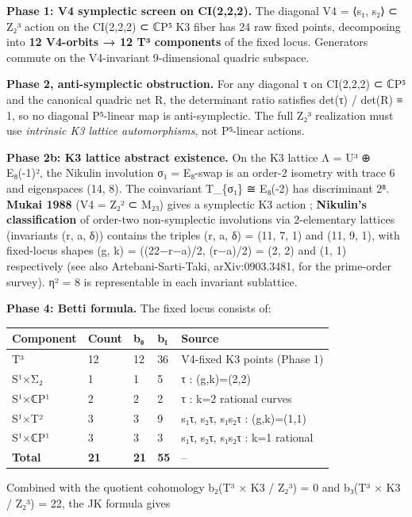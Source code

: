 \documentclass[11pt,a4paper]{article}
\begin{document}
\textbf{Phase 1: V4 symplectic screen on CI(2,2,2).} The diagonal V4 = ⟨s₁, s₂⟩ ⊂ Z₂³ action on the CI(2,2,2) ⊂ ℂP⁵ K3 fiber has 24 raw fixed points, decomposing into \textbf{12 V4-orbits → 12 T³ components} of the fixed locus. Generators commute on the V4-invariant 9-dimensional quadric subspace.

\textbf{Phase 2, anti-symplectic obstruction.} For any diagonal τ on CI(2,2,2) ⊂ ℂP⁵ and the canonical quadric net R, the determinant ratio satisfies det(τ) / det(R) ≡ 1, so no diagonal P⁵-linear map is anti-symplectic. The full Z₂³ realization must use \emph{intrinsic K3 lattice automorphisms}, not P⁵-linear actions.

\textbf{Phase 2b: K3 lattice abstract existence.} On the K3 lattice Λ = U³ ⊕ E₈(-1)², the Nikulin involution σ₁ = E₈-swap is an order-2 isometry with trace 6 and eigenspaces (14, 8). The coinvariant T\_\allowbreak{}\{σ₁\} ≅ E₈(-2) has discriminant 2⁸. \textbf{Mukai 1988} (V4 = Z₂² ⊂ M₂₃) gives a symplectic K3 action \cite{44}; \textbf{Nikulin's classification} of order-two non-symplectic involutions via 2-elementary lattices (invariants (r, a, δ)) \cite{51} contains the triples (r, a, δ) = (11, 7, 1) and (11, 9, 1), with fixed-locus shapes (g, k) = ((22−r−a)/2, (r−a)/2) = (2, 2) and (1, 1) respectively (see also Artebani-Sarti-Taki, arXiv:0903.3481, for the prime-order survey). η² = 8 is representable in each invariant sublattice.

\textbf{Phase 4: Betti formula.} The fixed locus consists of:

\begin{longtable}[]{@{}lllll@{}}
\toprule\noalign{}
Component & Count & b₀ & b₁ & Source \\
\midrule\noalign{}
\endhead
\bottomrule\noalign{}
\endlastfoot
T³ & 12 & 12 & 36 & V4-fixed K3 points (Phase 1) \\
S¹×Σ₂ & 1 & 1 & 5 & τ : (g,k)=(2,2) \\
S¹×ℂP¹ & 2 & 2 & 2 & τ : k=2 rational curves \\
S¹×T² & 3 & 3 & 9 & s₁τ, s₂τ, s₁s₂τ : (g,k)=(1,1) \\
S¹×ℂP¹ & 3 & 3 & 3 & s₁τ, s₂τ, s₁s₂τ : k=1 rational \\
\textbf{Total} & \textbf{21} & \textbf{21} & \textbf{55} & -- \\
\end{longtable}

Combined with the quotient cohomology b₂(T³ × K3 / Z₂³) = 0 and b₃(T³ × K3 / Z₂³) = 22, the JK formula gives
\end{document}
